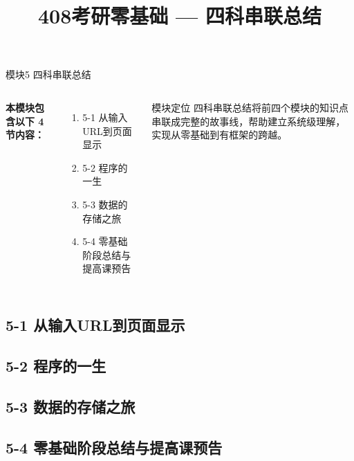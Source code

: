 \documentclass[10pt, aspectratio=169]{beamer}
\title{408考研零基础 --- 四科串联总结}
\author{}
\date{}
\begin{document}
\frame{\titlepage}

\begin{frame}{模块5 四科串联总结}
    \begin{columns}[T]
        \textbf{本模块包含以下 4 节内容：}
        \begin{enumerate}
            \item 5-1 从输入URL到页面显示
            \item 5-2 程序的一生
            \item 5-3 数据的存储之旅
            \item 5-4 零基础阶段总结与提高课预告
        \end{enumerate}
        \begin{block}{模块定位}
            四科串联总结将前四个模块的知识点串联成完整的故事线，帮助建立系统级理解，实现从零基础到有框架的跨越。
        \end{block}
    \end{columns}
\end{frame}

\subsection{5-1 从输入URL到页面显示}


\subsection{5-2 程序的一生}


\subsection{5-3 数据的存储之旅}


\subsection{5-4 零基础阶段总结与提高课预告}

\end{document}
